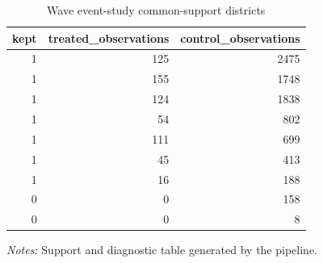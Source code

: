\begin{table}[!htbp] \centering
\caption{Wave event-study common-support districts}
\begin{tabular}{rrr}
\toprule
kept & treated\_observations & control\_observations \\
\midrule
1 & 125 & 2475 \\
1 & 155 & 1748 \\
1 & 124 & 1838 \\
1 & 54 & 802 \\
1 & 111 & 699 \\
1 & 45 & 413 \\
1 & 16 & 188 \\
0 & 0 & 158 \\
0 & 0 & 8 \\
\bottomrule
\end{tabular}

\begin{minipage}{0.98\textwidth}
\footnotesize \textit{Notes:} Support and diagnostic table generated by the pipeline.
\end{minipage}
\end{table}
